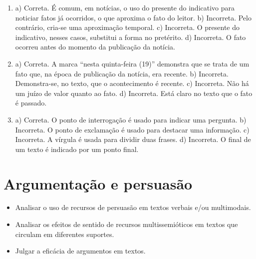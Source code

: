 \pagebreak
{}

\begin{enumerate}\color{rosa}
\item
a) Correta. É comum, em notícias, o uso do presente do indicativo para noticiar fatos já ocorridos, o que aproxima o fato do leitor.
b) Incorreta. Pelo contrário, cria-se uma aproximação temporal.
c) Incorreta. O presente do indicativo, nesses casos, substitui a forma no pretérito.
d) Incorreta. O fato ocorreu antes do momento da publicação da notícia.

\item
a) Correta. A marca “nesta quinta-feira (19)” demonstra que se trata de um fato que, na época de publicação da notícia, era recente.
b) Incorreta. Demonstra-se, no texto, que o acontecimento é recente.
c) Incorreta. Não há um juízo de valor quanto ao fato.
d) Incorreta. Está claro no texto que o fato é passado.

\item
a) Correta. O ponto de interrogação é usado para indicar uma pergunta.
b) Incorreta. O ponto de exclamação é usado para destacar uma
informação.
c) Incorreta. A vírgula é usada para dividir duas frases.
d) Incorreta. O final de um texto é indicado por um ponto final.
\end{enumerate}

\chapter{Argumentação e persuasão}



\begin{itemize}
\item Analisar o uso de recursos de persuasão em textos verbais e/ou
multimodais.

\item Analisar os efeitos de sentido de recursos multissemióticos em textos
que circulam em diferentes suportes.

\item Julgar a eficácia de argumentos em textos.
\end{itemize}

